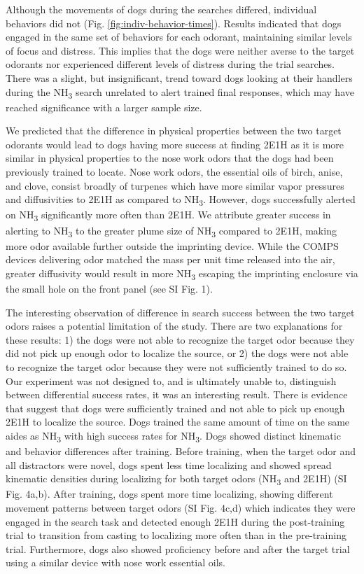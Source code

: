 \documentclass[
]{article}
\begin{document}
Although the movements of dogs during the searches differed, individual behaviors did not (Fig. \ref{fig:indiv-behavior-times}). Results indicated that dogs engaged in the same set of behaviors for each odorant, maintaining similar levels of focus and distress. This implies that the dogs were neither averse to the target odorants nor experienced different levels of distress during the trial searches. There was a slight, but insignificant, trend toward dogs looking at their handlers during the NH\textsubscript{3} search unrelated to alert trained final responses, which may have reached significance with a larger sample size.

We predicted that the difference in physical properties between the two target odorants would lead to dogs having more success at finding 2E1H as it is more similar in physical properties to the nose work odors that the dogs had been previously trained to locate. Nose work odors, the essential oils of birch, anise, and clove, consist broadly of turpenes which have more similar vapor pressures and diffusivities to 2E1H as compared to NH\textsubscript{3}. However, dogs successfully alerted on NH\textsubscript{3} significantly more often than 2E1H. We attribute greater success in alerting to NH\textsubscript{3} to the greater plume size of NH\textsubscript{3} compared to 2E1H, making more odor available further outside the imprinting device. While the COMPS devices delivering odor matched the mass per unit time released into the air, greater diffusivity would result in more NH\textsubscript{3} escaping the imprinting enclosure via the small hole on the front panel (see SI Fig. 1).

The interesting observation of difference in search success between the two target odors raises a potential limitation of the study. There are two explanations for these results: 1) the dogs were not able to recognize the target odor because they did not pick up enough odor to localize the source, or 2) the dogs were not able to recognize the target odor because they were not sufficiently trained to do so. Our experiment was not designed to, and is ultimately unable to, distinguish between differential success rates, it was an interesting result. There is evidence that suggest that dogs were sufficiently trained and not able to pick up enough 2E1H to localize the source. Dogs trained the same amount of time on the same aides as NH\textsubscript{3} with high success rates for NH\textsubscript{3}. Dogs showed distinct kinematic and behavior differences after training. Before training, when the target odor and all distractors were novel, dogs spent less time localizing and showed spread kinematic densities during localizing for both target odors (NH\textsubscript{3} and 2E1H) (SI Fig. 4a,b). After training, dogs spent more time localizing, showing different movement patterns between target odors (SI Fig. 4c,d) which indicates they were engaged in the search task and detected enough 2E1H during the post-training trial to transition from casting to localizing more often than in the pre-training trial. Furthermore, dogs also showed proficiency before and after the target trial using a similar device with nose work essential oils.
\end{document}
